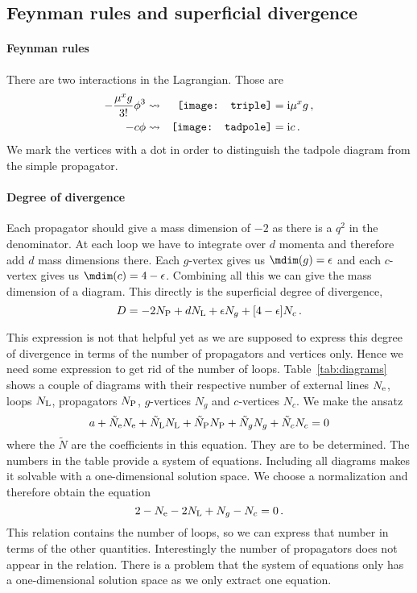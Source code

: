 \documentclass[11pt, english, fleqn, DIV=15, headinclude]{scrartcl}
\begin{document}
\subsection{Feynman rules and superficial divergence}

\paragraph{Feynman rules}

There are two interactions in the Lagrangian. Those are
\begin{align*}
    - \frac{\mu^x g}{3!} \phi^3
    &\leadsto &
    \vcenter{\hbox{\texttt{[image: triple]}}}
    &= \iup \mu^x g \,,
    \\
    - c\phi
    &\leadsto &
    \vcenter{\hbox{\texttt{[image: tadpole]}}}
    &= \iup c \,.
    \\
\end{align*}
We mark the vertices with a dot in order to distinguish the tadpole diagram
from the simple propagator.

\paragraph{Degree of divergence}

Each propagator should give a mass dimension of $-2$ as there is a $q^2$ in the
denominator. At each loop we have to integrate over $d$ momenta and therefore
add $d$ mass dimensions there. Each $g$-vertex gives us $\mdim(g) = \epsilon$
and each $c$-vertex gives us $\mdim(c) = 4 - \epsilon$. Combining all this we
can give the mass dimension of a diagram. This directly is the superficial
degree of divergence,
\[
    D = - 2 N_\text P + d N_\text L + \epsilon N_g + [4 - \epsilon] N_c \,.
\]

This expression is not that helpful yet as we are supposed to express this
degree of divergence in terms of the number of propagators and vertices only.
Hence we need some expression to get rid of the number of loops.
Table~\ref{tab:diagrams} shows a couple of diagrams with their respective
number of external lines $N_\text e$, loops $N_\text L$, propagators $N_\text
P$, $g$-vertices $N_g$ and $c$-vertices $N_c$. We make the ansatz
\[
    a
    + \tilde N_\text e N_\text e
    + \tilde N_\text L N_\text L
    + \tilde N_\text P N_\text P
    + \tilde N_g N_g
    + \tilde N_c N_c
    = 0
\]
where the $\tilde N$ are the coefficients in this equation. They are to be
determined. The numbers in the table provide a system of equations. Including
all diagrams makes it solvable with a one-dimensional solution space. We choose
a normalization and therefore obtain the equation
\[
    2
    - N_\text e
    -2 N_\text L
    + N_g
    - N_c
    = 0 \,.
\]
This relation contains the number of loops, so we can express that number in
terms of the other quantities. Interestingly the number of propagators does not
appear in the relation. There is a problem that the system of equations only
has a one-dimensional solution space as we only extract one equation.
\end{document}
